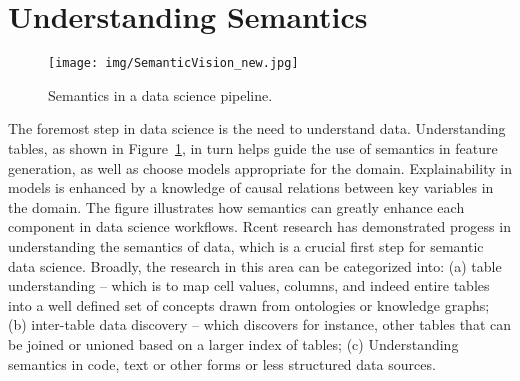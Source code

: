 \documentclass[sigconf, nonacm]{acmart}
\newcommand{\topic}[1]{\noindent \underline{ \bf #1}}
\begin{document}

\section{Understanding Semantics}
\begin{figure}
    \centering   \texttt{[image: img/SemanticVision\_new.jpg]}
    \caption{Semantics in a data science pipeline.}
    \label{fig:overview}
\end{figure}
\label{data_section}
The foremost step in data science is the need to understand data. Understanding tables, as shown in Figure~\ref{fig:overview}, in turn helps guide the use of semantics in feature generation, as well as choose models appropriate for the domain.  Explainability in models is enhanced by a knowledge of causal relations between key variables in the domain.  The figure illustrates how semantics can greatly enhance each component in data science workflows. 
Rcent research has demonstrated progess in understanding the semantics of data, which is a crucial first step for semantic data science.
Broadly, the research in this area can be categorized into: (a) table understanding -- which is to map cell values, columns, and indeed entire tables into a well defined set of concepts drawn from ontologies or knowledge graphs; (b) inter-table data discovery -- which discovers for instance, other tables that can be joined or unioned based on a larger index of tables; (c) Understanding semantics in code, text or other forms or less structured data sources. 
 
\end{document}
